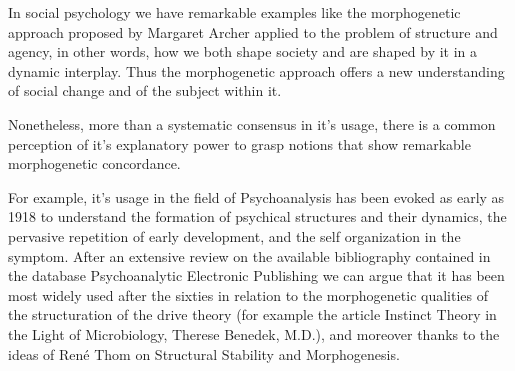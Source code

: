 \documentclass[fleqn,10pt]{wlscirep}
\begin{document}
In social psychology we have remarkable examples like the morphogenetic approach proposed by Margaret Archer applied to the problem of structure and agency, in other words, how we both shape society and are shaped by it in a dynamic interplay. Thus the morphogenetic approach offers a new understanding of social change and of the subject within it.  

Nonetheless, more than a systematic consensus in it’s usage, there is a common perception of it’s explanatory power to grasp notions that show remarkable morphogenetic concordance.

For example, it’s usage in the field of Psychoanalysis has been evoked as early as 1918 to understand the formation of psychical structures and their dynamics, the pervasive repetition of early development, and the self organization in the symptom. After an extensive review on the available bibliography contained in the database Psychoanalytic Electronic Publishing we can argue that it has been most widely used after the sixties in relation to the morphogenetic qualities of the structuration of the drive theory (for example the article Instinct Theory in the Light of Microbiology, Therese Benedek, M.D.), and moreover thanks to the ideas of René Thom on Structural Stability and Morphogenesis.





\cite{straus1977societal}







\end{document}
